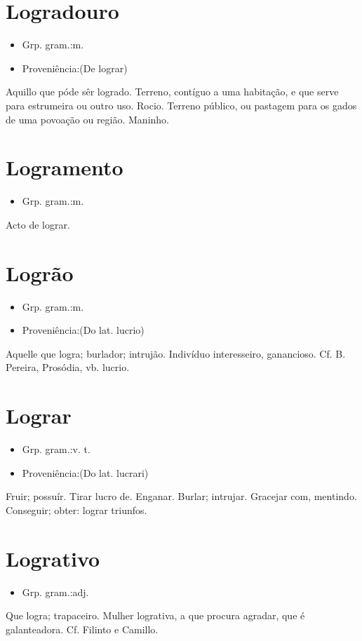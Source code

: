 \section{Logradouro}
\begin{itemize}
\item {Grp. gram.:m.}
\end{itemize}
\begin{itemize}
\item {Proveniência:(De \textunderscore lograr\textunderscore )}
\end{itemize}
Aquillo que póde sêr logrado.
Terreno, contíguo a uma habitação, e que serve para estrumeira ou outro uso.
Rocio.
Terreno público, ou pastagem para os gados de uma povoação ou região.
Maninho.
\section{Logramento}
\begin{itemize}
\item {Grp. gram.:m.}
\end{itemize}
Acto de lograr.
\section{Logrão}
\begin{itemize}
\item {Grp. gram.:m.}
\end{itemize}
\begin{itemize}
\item {Proveniência:(Do lat. \textunderscore lucrio\textunderscore )}
\end{itemize}
Aquelle que logra; burlador; intrujão.
Indivíduo interesseiro, ganancioso. Cf. B. Pereira, \textunderscore Prosódia\textunderscore , vb. \textunderscore lucrio\textunderscore .
\section{Lograr}
\begin{itemize}
\item {Grp. gram.:v. t.}
\end{itemize}
\begin{itemize}
\item {Proveniência:(Do lat. \textunderscore lucrari\textunderscore )}
\end{itemize}
Fruir; possuír.
Tirar lucro de.
Enganar.
Burlar; intrujar.
Gracejar com, mentindo.
Conseguir; obter: \textunderscore lograr triunfos\textunderscore .
\section{Logrativo}
\begin{itemize}
\item {Grp. gram.:adj.}
\end{itemize}
Que logra; trapaceiro.
\textunderscore Mulher logrativa\textunderscore , a que procura agradar, que é galanteadora. Cf. Filinto e Camillo.
